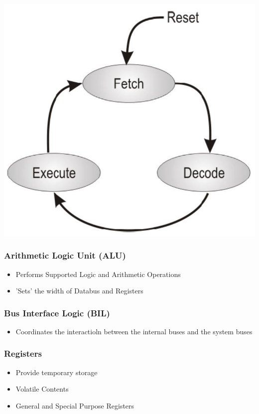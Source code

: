 \begin{multicols}{2}
\begin{multicols}{2}
\includegraphics[width=0.85\linewidth]{images/FDELoop}
\end{multicols}

\subsubsection{Arithmetic Logic Unit (ALU)}
\begin{itemize}
    \item Performs Supported Logic and Arithmetic Operations
    \item 'Sets' the width of Databus and Registers
\end{itemize}

\subsubsection{Bus Interface Logic (BIL)}
\begin{itemize}
    \item Coordinates the interactioln between the internal buses and the system buses
\end{itemize}

\subsubsection{Registers}
    \begin{itemize}
        \item Provide temporary storage
        \item Volatile Contents
        \item General and Special Purpose Registers
    \end{itemize}
\end{multicols}

